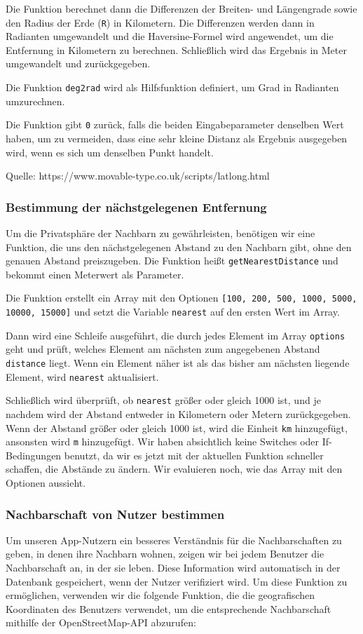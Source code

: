 Die Funktion berechnet dann die Differenzen der Breiten- und Längengrade sowie den Radius der Erde (\texttt{R}) in Kilometern. Die Differenzen werden dann in Radianten umgewandelt und die Haversine-Formel wird angewendet, um die Entfernung in Kilometern zu berechnen. Schließlich wird das Ergebnis in Meter umgewandelt und zurückgegeben.

Die Funktion \texttt{deg2rad} wird als Hilfsfunktion definiert, um Grad in Radianten umzurechnen.

Die Funktion gibt \texttt{0} zurück, falls die beiden Eingabeparameter denselben Wert haben, um zu vermeiden, dass eine sehr kleine Distanz als Ergebnis ausgegeben wird, wenn es sich um denselben Punkt handelt.

Quelle: https://www.movable-type.co.uk/scripts/latlong.html

\subsubsection{Bestimmung der nächstgelegenen Entfernung}
Um die Privatsphäre der Nachbarn zu gewährleisten, benötigen wir eine Funktion, die uns den nächstgelegenen Abstand zu den Nachbarn gibt, ohne den genauen Abstand preiszugeben. Die Funktion heißt \texttt{getNearestDistance} und bekommt einen Meterwert als Parameter.

Die Funktion erstellt ein Array mit den Optionen \texttt{[100, 200, 500, 1000, 5000, 10000, 15000]} und setzt die Variable \texttt{nearest} auf den ersten Wert im Array.

Dann wird eine Schleife ausgeführt, die durch jedes Element im Array \texttt{options} geht und prüft, welches Element am nächsten zum angegebenen Abstand \texttt{distance} liegt. Wenn ein Element näher ist als das bisher am nächsten liegende Element, wird \texttt{nearest} aktualisiert.

Schließlich wird überprüft, ob \texttt{nearest} größer oder gleich 1000 ist, und je nachdem wird der Abstand entweder in Kilometern oder Metern zurückgegeben. Wenn der Abstand größer oder gleich 1000 ist, wird die Einheit \texttt{km} hinzugefügt, ansonsten wird \texttt{m} hinzugefügt. Wir haben absichtlich keine Switches oder If-Bedingungen benutzt, da wir es jetzt mit der aktuellen Funktion schneller schaffen, die Abstände zu ändern. Wir evaluieren noch, wie das Array mit den Optionen aussieht.


\subsubsection{Nachbarschaft von Nutzer bestimmen}
Um unseren App-Nutzern ein besseres Verständnis für die Nachbarschaften zu geben, in denen ihre Nachbarn wohnen, zeigen wir bei jedem Benutzer die Nachbarschaft an, in der sie leben. Diese Information wird automatisch in der Datenbank gespeichert, wenn der Nutzer verifiziert wird. Um diese Funktion zu ermöglichen, verwenden wir die folgende Funktion, die die geografischen Koordinaten des Benutzers verwendet, um die entsprechende Nachbarschaft mithilfe der OpenStreetMap-API abzurufen:

